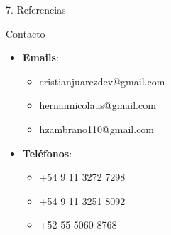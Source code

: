 \documentclass[final]{beamer}
\newlength{\onecolwid}
\begin{document}
\begin{frame}[t]
\begin{columns}[t]
\begin{column}{\onecolwid}
\begin{block}{7. Referencias}

\end{block}


\begin{alertblock}{Contacto}
\begin{itemize}
\item \textbf{Emails}:
  \begin{itemize}
  \item cristianjuarezdev@gmail.com
  \item hernannicolaus@gmail.com
  \item hzambrano110@gmail.com
  \end{itemize}
\item \textbf{Teléfonos}:
  \begin{itemize}
  \item +54 9 11 3272 7298
  \item +54 9 11 3251 8092
  \item +52 55 5060 8768
  \end{itemize}
\end{itemize}
\end{alertblock}

\end{column}

\end{columns}
\end{frame}
\end{document}
